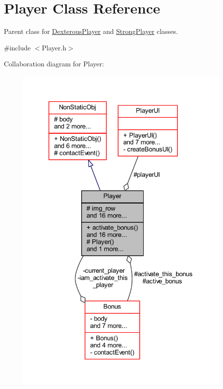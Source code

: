 \hypertarget{class_player}{}\section{Player Class Reference}
\label{class_player}


Parent class for \hyperlink{class_dexterous_player}{Dexterous\+Player} and \hyperlink{class_strong_player}{Strong\+Player} classes.  




{\ttfamily \#include $<$Player.\+h$>$}



Collaboration diagram for Player\+:
\nopagebreak
\begin{figure}[H]
\begin{center}
\leavevmode
\includegraphics[width=304pt]{class_player__coll__graph}
\end{center}
\end{figure}
